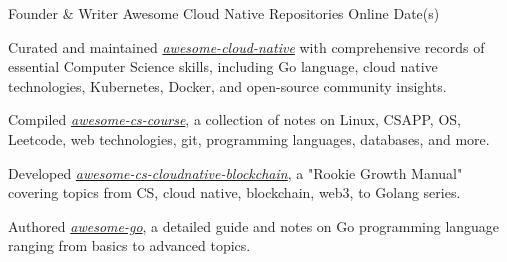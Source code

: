 

\begin{cventries}

 \cventry
    {Founder \& Writer} %
    {Awesome Cloud Native Repositories} %
    {Online} %
    {Date(s)} %
    {
      \begin{cvitems} %
        \item {Curated and maintained \href{https://github.com/cubxxw/awesome-cloud-native}{\textit{awesome-cloud-native}} with comprehensive records of essential Computer Science skills, including Go language, cloud native technologies, Kubernetes, Docker, and open-source community insights.}
        \item {Compiled \href{https://github.com/cubxxw/awesome-cs-course}{\textit{awesome-cs-course}}, a collection of notes on Linux, CSAPP, OS, Leetcode, web technologies, git, programming languages, databases, and more.}
        \item {Developed \href{https://github.com/cubxxw/awesome-cs-cloudnative-blockchain}{\textit{awesome-cs-cloudnative-blockchain}}, a "Rookie Growth Manual" covering topics from CS, cloud native, blockchain, web3, to Golang series.}
        \item {Authored \href{https://github.com/cubxxw/awesome-go}{\textit{awesome-go}}, a detailed guide and notes on Go programming language ranging from basics to advanced topics.}
      \end{cvitems}
    }

\end{cventries}
